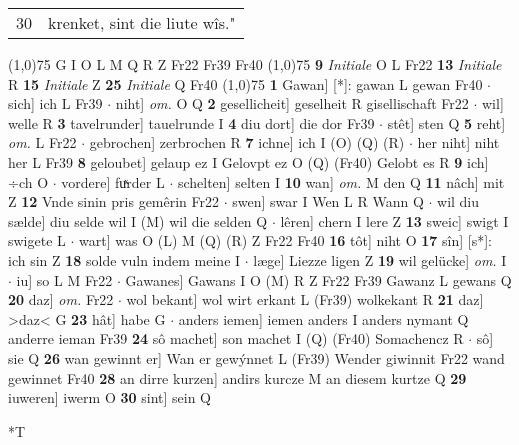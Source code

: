 \documentclass[8pt,a4paper,notitlepage]{article}
\begin{document}
\begin{table}[ht]
\begin{minipage}[t]{0.5\linewidth}
\begin{tabular}{rl}
30 & krenket, sint die liute wîs."\\ 
\end{tabular}
\scriptsize
\line(1,0){75} \newline
G I O L M Q R Z Fr22 Fr39 Fr40 \newline
\line(1,0){75} \newline
\textbf{9} \textit{Initiale} O L Fr22  \textbf{13} \textit{Initiale} R  \textbf{15} \textit{Initiale} Z  \textbf{25} \textit{Initiale} Q Fr40  \newline
\line(1,0){75} \newline
\textbf{1} Gawan] [*]: gawan L gewan Fr40  $\cdot$ sich] ich L Fr39  $\cdot$ niht] \textit{om.} O Q \textbf{2} gesellicheit] geselheit R gisellischaft Fr22  $\cdot$ wil] welle R \textbf{3} tavelrunder] tauelrunde I \textbf{4} diu dort] die dor Fr39  $\cdot$ stêt] sten Q \textbf{5} reht] \textit{om.} L Fr22  $\cdot$ gebrochen] zerbrochen R \textbf{7} ichne] ich I (O) (Q) (R)  $\cdot$ her niht] niht her L Fr39 \textbf{8} geloubet] gelaup ez I Gelovpt ez O (Q) (Fr40) Gelobt es R \textbf{9} ich] ÷ch O  $\cdot$ vordere] fuͯrder L  $\cdot$ schelten] selten I \textbf{10} wan] \textit{om.} M den Q \textbf{11} nâch] mit Z \textbf{12} Vnde sinin pris gemêrin Fr22  $\cdot$ swen] swar I Wen L R Wann Q  $\cdot$ wil diu sælde] diu selde wil I (M) wil die selden Q  $\cdot$ lêren] chern I lere Z \textbf{13} sweic] swigt I swigete L  $\cdot$ wart] was O (L) M (Q) (R) Z Fr22 Fr40 \textbf{16} tôt] niht O \textbf{17} sîn] [s*]: ich sin Z \textbf{18} solde vuln indem meine I  $\cdot$ læge] Liezze ligen Z \textbf{19} wil gelücke] \textit{om.} I  $\cdot$ iu] so L M Fr22  $\cdot$ Gawanes] Gawans I O (M) R Z Fr22 Fr39 Gawanz L gewans Q \textbf{20} daz] \textit{om.} Fr22  $\cdot$ wol bekant] wol wirt erkant L (Fr39) wolkekant R \textbf{21} daz] >daz< G \textbf{23} hât] habe G  $\cdot$ anders iemen] iemen anders I anders nymant Q anderre ieman Fr39 \textbf{24} sô machet] son machet I (Q) (Fr40) Somachencz R  $\cdot$ sô] sie Q \textbf{26} wan gewinnt er] Wan er gewýnnet L (Fr39) Wender giwinnit Fr22 wand gewinnet Fr40 \textbf{28} an dirre kurzen] andirs kurcze M an diesem kurtze Q \textbf{29} iuweren] iwerm O \textbf{30} sint] sein Q \newline
\end{minipage}
\hspace{0.5cm}
\begin{minipage}[t]{0.5\linewidth}
\small
\begin{center}*T
\end{center}
\begin{tabular}{rl}

\end{tabular}
\end{minipage}
\end{table}
\end{document}
